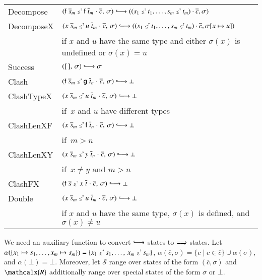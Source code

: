 \noindent
\begin{tabular}{ll}
  \textsf{Decompose} & $ (\cst{f} \; \tuple{s}{m} \MATCH \cst{f} \; \tuple{t}{m} \mathrel{\cdot} \overline{c}, \, \sigma) \Matchiiarrow {} ( (s_1 \MATCH t_1, \ldots, s_m \MATCH t_m) \cdot \overline{c}, \sigma ) $ \\[\jot]
  \textsf{DecomposeX} & $(x \; \tuple{s}{{m}} \MATCH u \; \tuple{t}{{m}} \mathrel{\cdot} \overline{c}, \, \sigma) \Matchiiarrow {} ( (s_1 \MATCH t_1, \ldots, s_m \MATCH t_m) \cdot \overline{c}, \sigma[x \mapsto u] )$ \\
                    & if $x$ and $u$ have the same type and either $\sigma(x)$ is undefined or $\sigma(x)=u$ \\[\jot]
  \textsf{Success} & $ ([\,], \, \sigma) \Matchiiarrow  \sigma $ \\[\jot]
  \textsf{Clash}    & $ (\cst{f} \; \tuple{s}{m} \MATCH \cst{g} \; \tuple{t}{n} \mathrel{\cdot} \overline{c}, \, \sigma) \Matchiiarrow \bot $ \\[\jot]
  \textsf{ClashTypeX}    & $(x \; \tuple{s}{{m}} \MATCH u \; \tuple{t}{{m}} \mathrel{\cdot} \overline{c}, \, \sigma) \Matchiiarrow \bot$ \\
                         & if~$x$ and $u$ have different types  \\[\jot]
  \textsf{ClashLenXF}    & $(x \; \tuple{s}{{m}} \MATCH \cst{f} \; \tuple{t}{{n}} \mathrel{\cdot} \overline{c}, \, \sigma) \Matchiiarrow \bot$ \\
                         & if~$m > n$  \\[\jot]
  \textsf{ClashLenXY}    & $(x \; \tuple{s}{{m}} \MATCH y \; \tuple{t}{{n}} \mathrel{\cdot} \overline{c}, \, \sigma) \Matchiiarrow \bot$ \\
                         & if~$x \neq y$ and $m > n$ \\[\jot]
  \textsf{ClashFX}    & $(\cst{f} \; \overline{s} \MATCH x \; \overline{t}  \mathrel{\cdot} \overline{c}, \, \sigma) \Matchiiarrow \bot$ \\[\jot]
  \textsf{Double}    & $(x \; \tuple{s}{{m}} \MATCH u \; \tuple{t}{{m}}  \mathrel{\cdot} \overline{c}, \, \sigma) \Matchiiarrow \bot$ \\
                     & if $x$ and $u$ have the same type, $\sigma(x)$ is defined, and $\sigma(x) \neq u$ \\[\jot]
\end{tabular}

\newcommand\AlphaMatch[1]{\alpha(#1)}

We need an auxiliary function to convert $\Matchiiarrow$ states to
$\Longrightarrow$ states.
Let
$\AlphaMatch{\{ x_1 \mapsto s_1,\allowbreak \ldots, x_m \mapsto s_m \}}
 = \{ x_1 \MATCH s_1,\ldots,\,\allowbreak x_m \MATCH s_m \}$,
$\AlphaMatch{\overline{c}, \sigma} =
\{ c \mid c \in \overline{c} \} \mathrel\cup \AlphaMatch{\sigma}$, and
$\AlphaMatch{\bot} = \bot$.
%
Moreover, let $\mathcal{S}$ range over states of the form $(\overline{c}, \sigma)$ and
$\mathcalx{R}$ additionally range over special states of the form $\sigma$ or
$\bot$.


